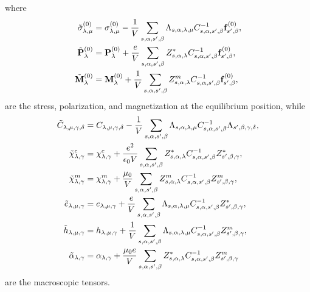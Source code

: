 \documentclass[12pt,a4paper,twoside]{report}
\begin{document}
where 
\begin{align}
\tilde \sigma^{(0)}_{\lambda,\mu}&= \sigma^{(0)}_{\lambda,\mu}
-{1\over V} \sum_{s,\alpha,s',\beta} \Lambda_{s,\alpha,\lambda,\mu}
C^{-1}_{s,\alpha,s',\beta} {\bf f}^{(0)}_{s',\beta}, \\
\tilde {\bf P}^{(0)}_\lambda&= {\bf P}^{(0)}_\lambda +{e\over V}
\sum_{s,\alpha,s',\beta} Z^*_{s,\alpha,\lambda} C^{-1}_{s,\alpha,s',\beta}
{\bf f}^{(0)}_{s',\beta}, \\
\tilde {\bf M}^{(0)}_\lambda&= {\bf M}^{(0)}_\lambda +{1\over V}
\sum_{s,\alpha,s',\beta} Z^m_{s,\alpha,\lambda} C^{-1}_{s,\alpha,s',\beta}
{\bf f}^{(0)}_{s',\beta},
\end{align}
are the stress, polarization, and magnetization at the equilibrium position,
while
\begin{align}
\tilde C_{\lambda,\mu,\gamma,\delta}&= C_{\lambda,\mu,\gamma,\delta}
-{1\over V}\sum_{s,\alpha,s',\beta} \Lambda_{s,\alpha,\lambda,\mu}
C^{-1}_{s,\alpha,s',\beta}  \Lambda_{s',\beta,\gamma,\delta},\\
\tilde \chi^e_{\lambda,\gamma}&= \chi^e_{\lambda,\gamma} 
+{e^2 \over \epsilon_0 V} \sum_{s,\alpha,s',\beta} Z^*_{s,\alpha,\lambda}
C^{-1}_{s,\alpha,s',\beta}  Z^*_{s',\beta,\gamma},\\
\tilde \chi^m_{\lambda,\gamma}&= \chi^m_{\lambda,\gamma} 
+{\mu_0 \over V} \sum_{s,\alpha,s',\beta} Z^m_{s,\alpha,\lambda}
C^{-1}_{s,\alpha,s',\beta}  Z^m_{s',\beta,\gamma}, \\
\tilde e_{\lambda,\mu,\gamma}&= e_{\lambda,\mu,\gamma}
+{e\over V}\sum_{s,\alpha,s',\beta} \Lambda_{s,\alpha,\lambda,\mu}
C^{-1}_{s,\alpha,s',\beta} Z^*_{s',\beta,\gamma}
,\\
\tilde h_{\lambda,\mu,\gamma}&= h_{\lambda,\mu,\gamma}
+{1\over V}\sum_{s,\alpha,s',\beta} \Lambda_{s,\alpha,\lambda,\mu}
C^{-1}_{s,\alpha,s',\beta} Z^m_{s',\beta,\gamma},\\
\tilde \alpha_{\lambda,\gamma}&= \alpha_{\lambda,\gamma}
+{\mu_0 e \over V}\sum_{s,\alpha,s',\beta} Z^*_{s,\alpha,\lambda}
C^{-1}_{s,\alpha,s',\beta}  Z^m_{s',\beta,\gamma}
\end{align}
are the macroscopic tensors.
\\
\end{document}
